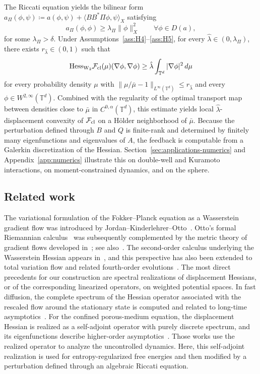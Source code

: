 \documentclass[11pt]{article}
\numberwithin{equation}{section}
\theoremstyle{definition}
\newcommand{\T}{\mathbb{T}}
\newcommand{\F}{\mathcal{F}}
\newcommand{\Wtwo}{\operatorname{W}_2}
\begin{document}
The Riccati equation yields the bilinear form $a_\Pi(\phi,\psi) \coloneqq a(\phi,\psi) + \langle BB^*\Pi\phi, \psi\rangle_X$ satisfying 
\[
a_\Pi (\phi,\phi) \ge \lambda_\Pi \|\phi\|_X^2 \qquad \forall \phi\in D(a),
\]
for some $\lambda_\Pi > \delta$.
Under Assumptions~\ref{ass:H4}--\ref{ass:H5}, for every $\hat{\lambda} \in (0,\lambda_\Pi)$, there exists $r_{\hat{\lambda}} \in (0,1)$ such that
\[
\mathrm{Hess}_{\Wtwo} \F_{\rm cl}(\mu)(\nabla\phi,\nabla\phi) \ge \hat{\lambda} \int_{\T^d} |\nabla\phi|^2 \, d\mu
\]
for every probability density $\mu$ with $\|\mu/\bar\mu - 1\|_{L^\infty(\T^d)} \le r_{\hat{\lambda}}$ and every $\phi \in W^{2,\infty}(\T^d)$.
Combined with the regularity of the optimal transport map between densities close to $\bar\mu$ in $C^{0,\alpha}(\T^d)$, this estimate yields local $\hat\lambda$-displacement convexity of $\F_{\rm cl}$ on a H\"older neighborhood of $\bar\mu$.
Because the perturbation defined through $B$ and $Q$ is finite-rank and determined by finitely many eigenfunctions and eigenvalues of $A$, the feedback is computable from a Galerkin discretization of the Hessian. 
Section~\ref{sec:applications-numerics} and Appendix~\ref{app:numerics} illustrate this on double-well and Kuramoto interactions, on moment-constrained dynamics, and on the sphere.

\subsection{Related work}

The variational formulation of the Fokker--Planck equation as a Wasserstein gradient flow was introduced by Jordan--Kinderlehrer--Otto~\cite{JordanKinderlehrerOtto1998}. 
Otto's formal Riemannian calculus~\cite{Otto2001} was subsequently complemented by the metric theory of gradient flows developed in~\cite{AmbrosioGigliSavare2008}; see also~\cite{Santambrogio2017}.
The second-order calculus underlying the Wasserstein Hessian appears in~\cite{Otto2001, Lott2008, Gigli2012}, and this perspective has also been extended to total variation flow and related fourth-order evolutions~\cite{CarlierPoon2019}.
The most direct precedents for our construction are spectral realizations of displacement Hessians, or of the corresponding linearized operators, on weighted potential spaces.
In fast diffusion, the complete spectrum of the Hessian operator associated with the rescaled flow around the stationary state is computed and related to long-time asymptotics~\cite{denzler2005fast}.
For the confined porous-medium equation, the displacement Hessian is realized as a self-adjoint operator with purely discrete spectrum, and its eigenfunctions describe higher-order asymptotics~\cite{seis2014long}.
Those works use the realized operator to analyze the uncontrolled dynamics.
Here, this self-adjoint realization is used for entropy-regularized free energies and then modified by a perturbation defined through an algebraic Riccati equation.
\end{document}
